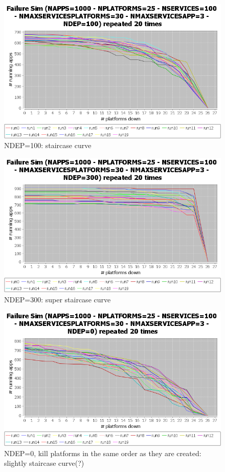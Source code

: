 \documentclass{article}
\begin{document}
\begin{figure}
\includegraphics[width=1.0\textwidth]{dep100}
\caption{NDEP=100: staircase curve}
\end{figure}

\begin{figure}
\includegraphics[width=1.0\textwidth]{dep300}
\caption{NDEP=300: super staircase curve}
\end{figure}



\begin{figure}
\includegraphics[width=1.0\textwidth]{dep0-noorder}
\caption{NDEP=0, kill platforms in the same order as they are created: slightly staircase curve(?)}
\end{figure}
\end{document}
